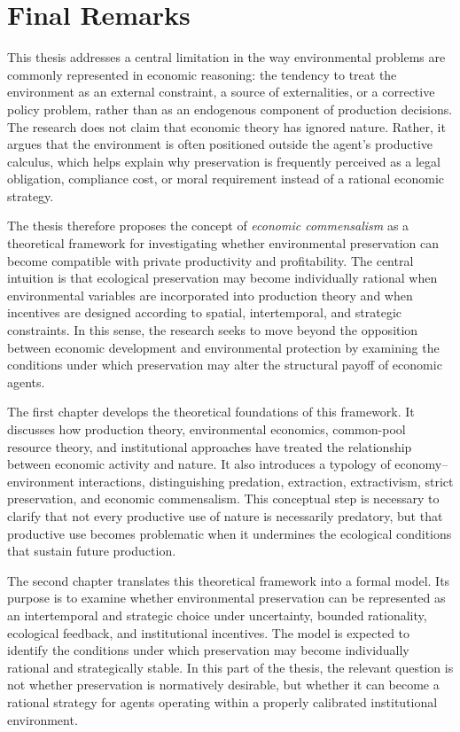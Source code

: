 

\section{Final Remarks}

This thesis addresses a central limitation in the way environmental problems are commonly represented in economic reasoning: the tendency to treat the environment as an external constraint, a source of externalities, or a corrective policy problem, rather than as an endogenous component of production decisions. The research does not claim that economic theory has ignored nature. Rather, it argues that the environment is often positioned outside the agent's productive calculus, which helps explain why preservation is frequently perceived as a legal obligation, compliance cost, or moral requirement instead of a rational economic strategy.

The thesis therefore proposes the concept of \emph{economic commensalism} as a theoretical framework for investigating whether environmental preservation can become compatible with private productivity and profitability. The central intuition is that ecological preservation may become individually rational when environmental variables are incorporated into production theory and when incentives are designed according to spatial, intertemporal, and strategic constraints. In this sense, the research seeks to move beyond the opposition between economic development and environmental protection by examining the conditions under which preservation may alter the structural payoff of economic agents.

The first chapter develops the theoretical foundations of this framework. It discusses how production theory, environmental economics, common-pool resource theory, and institutional approaches have treated the relationship between economic activity and nature. It also introduces a typology of economy--environment interactions, distinguishing predation, extraction, extractivism, strict preservation, and economic commensalism. This conceptual step is necessary to clarify that not every productive use of nature is necessarily predatory, but that productive use becomes problematic when it undermines the ecological conditions that sustain future production.

The second chapter translates this theoretical framework into a formal model. Its purpose is to examine whether environmental preservation can be represented as an intertemporal and strategic choice under uncertainty, bounded rationality, ecological feedback, and institutional incentives. The model is expected to identify the conditions under which preservation may become individually rational and strategically stable. In this part of the thesis, the relevant question is not whether preservation is normatively desirable, but whether it can become a rational strategy for agents operating within a properly calibrated institutional environment.

